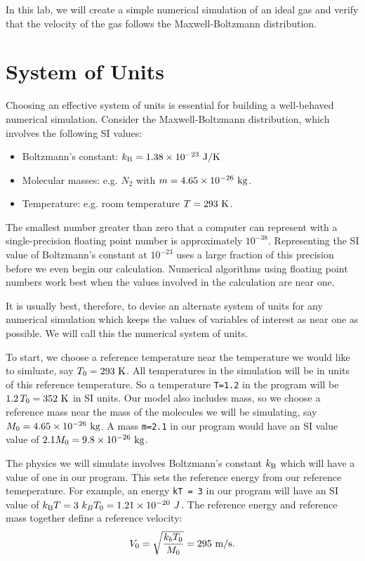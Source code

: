 In this lab, we will create a simple numerical simulation of an ideal
gas and verify that the velocity of the gas follows the
Maxwell-Boltzmann distribution.

\section{System of Units}

Choosing an effective system of units is essential for building a
well-behaved numerical simulation.  Consider the Maxwell-Boltzmann
distribution, which involves the following SI values:
\begin{itemize}
\item Boltzmann's constant: $k_{\rm B} = 1.38 \times 10^{-23}~\rm J/K$
\item Molecular masses: e.g. $N_2$ with $m =  4.65 \times 10^{-26}~ \rm kg$.
\item Temperature: e.g. room temperature $T = 293~\rm K$.
\end{itemize}
The smallest number greater than zero that a computer can represent
with a single-precision floating point number is approximately
$10^{-38}$. Representing the SI value of Boltzmann's constant at
$10^{-23}$ uses a large fraction of this precision before we even begin
our calculation.  Numerical algorithms using floating point numbers
work best when the values involved in the calculation are near one.

It is usually best, therefore, to devise an alternate system of units
for any numerical simulation which keeps the values of variables of
interest as near one as possible.  We will call this the numerical
system of units.

To start, we choose a reference temperature near the temperature
we would like to simluate, say $T_0 = 293~\rm K$.  All temperatures in
the simulation will be in units of this reference temperature.  So a
temperature {\tt T=1.2} in the program will be $1.2 \, T_0 = 352~\rm K$
in SI units.  Our model also includes mass, so we choose a reference
mass near the mass of the molecules we will be simulating, say $M_0 =
4.65 \times 10^{-26}~ \rm kg$.  A mass {\tt m=2.1} in our program would have
an SI value value of $2.1 M_0 = 9.8 \times 10^{-26}~ \rm kg$.

The physics we will simulate involves Boltzmann's constant $k_{\rm B}$
which will have a value of one in our program.  This sets the
reference energy from our reference temeperature.  For example, an
energy {\tt kT = 3} in our program will have an SI value of $k_{\rm B}
T = 3~k_B T_0 = 1.21 \times 10^{-20}~J$.  The reference energy and
reference mass together define a reference velocity:
\begin{displaymath}
V_0 = \sqrt{\frac{k_b T_0}{M_0}} = 295~ \rm m/s.  
\end{displaymath}  

